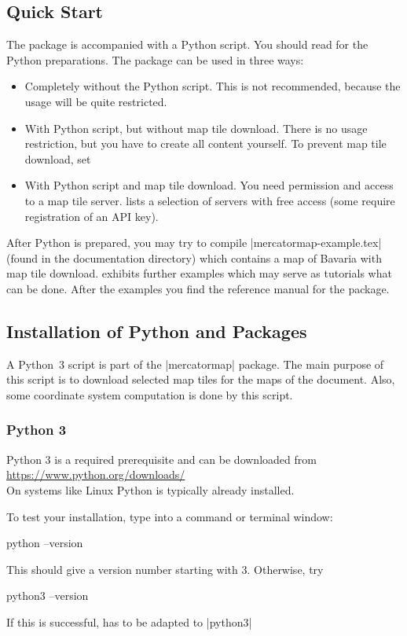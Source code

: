 \subsection{Quick Start}

The package is accompanied with a Python script. You should read
 for the Python preparations.
The package can be used in three ways:
\begin{itemize}
\item Completely without the Python script.
  This is not recommended, because the usage will be quite restricted.
\item With Python script, but without map tile download.
  There is no usage restriction, but you have to create all content yourself.
  To prevent map tile download, set
  \begin{dispListing}
  \end{dispListing}
\item With Python script and map tile download.
  You need permission and access to a map tile server.
   lists a selection of servers with free
  access (some require registration of an API key).
\end{itemize}

After Python is prepared, you may try to compile
|mercatormap-example.tex| (found in the documentation directory)
which contains a map of Bavaria with map tile download.
 exhibits further examples which may serve as
tutorials what can be done. After the examples you find the reference
manual for the package.

\clearpage
\subsection{Installation of Python and Packages}\label{sec:python}

A Python~3 script is part of the |mercatormap| package.
The main purpose of this script is to download selected map tiles for
the maps of the document. Also, some coordinate system computation is
done by this script.

\subsubsection{Python 3}
Python 3 is a required prerequisite and can be downloaded from\\
\url{https://www.python.org/downloads/}\\
On systems like Linux Python is typically already installed.\par
To test your installation, type into a command or terminal window:
\begin{dispListing}
  python --version
\end{dispListing}
This should give a version number starting with 3. Otherwise, try
\begin{dispListing}
  python3 --version
\end{dispListing}
If this is successful,  has to be adapted to |python3|

